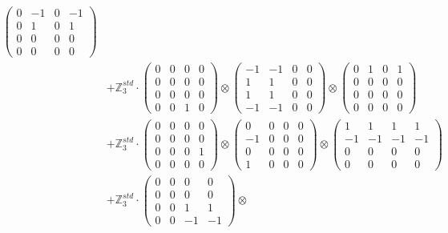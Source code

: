 \documentclass{article}
\begin{document}
{\begin{align}
            \begin{pmatrix} 0 & -1 & 0 & -1 \\ 0 & 1 & 0 & 1 \\ 0 & 0 & 0 & 0 \\ 0 & 0 & 0 & 0 \end{pmatrix} \\ 
        &+ \label{Rs4-Rc15-Solution-1-c17} \mathbb{Z}_3^{std} \cdot 
            \begin{pmatrix} 0 & 0 & 0 & 0 \\ 0 & 0 & 0 & 0 \\ 0 & 0 & 0 & 0 \\ 0 & 0 & 1 & 0 \end{pmatrix} \otimes 
            \begin{pmatrix} -1 & -1 & 0 & 0 \\ 1 & 1 & 0 & 0 \\ 1 & 1 & 0 & 0 \\ -1 & -1 & 0 & 0 \end{pmatrix} \otimes 
            \begin{pmatrix} 0 & 1 & 0 & 1 \\ 0 & 0 & 0 & 0 \\ 0 & 0 & 0 & 0 \\ 0 & 0 & 0 & 0 \end{pmatrix} \\ 
        &+ \label{Rs4-Rc15-Solution-1-c18} \mathbb{Z}_3^{std} \cdot 
            \begin{pmatrix} 0 & 0 & 0 & 0 \\ 0 & 0 & 0 & 0 \\ 0 & 0 & 0 & 1 \\ 0 & 0 & 0 & 0 \end{pmatrix} \otimes 
            \begin{pmatrix} 0 & 0 & 0 & 0 \\ -1 & 0 & 0 & 0 \\ 0 & 0 & 0 & 0 \\ 1 & 0 & 0 & 0 \end{pmatrix} \otimes 
            \begin{pmatrix} 1 & 1 & 1 & 1 \\ -1 & -1 & -1 & -1 \\ 0 & 0 & 0 & 0 \\ 0 & 0 & 0 & 0 \end{pmatrix} \\ 
        &+ \label{Rs4-Rc15-Solution-1-c19} \mathbb{Z}_3^{std} \cdot 
            \begin{pmatrix} 0 & 0 & 0 & 0 \\ 0 & 0 & 0 & 0 \\ 0 & 0 & 1 & 1 \\ 0 & 0 & -1 & -1 \end{pmatrix} \otimes 

\end{align}}
\end{document}
